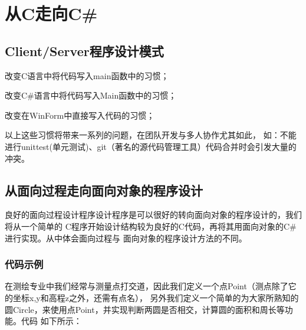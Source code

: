 ﻿%

\chapter{从C走向C\#}

\section{Client/Server程序设计模式}
改变C语言中将代码写入main函数中的习惯；

改变C\#语言中将代码写入Main函数中的习惯；

改变在WinForm中直接写入代码的习惯；

以上这些习惯将带来一系列的问题，在团队开发与多人协作尤其如此，
如：不能进行unittest(单元测试)、git（著名的源代码管理工具）代码合并时会引发大量的冲突。

\section{从面向过程走向面向对象的程序设计 }

良好的面向过程设计程序设计程序是可以很好的转向面向对象的程序设计的，我们将从一个简单的
C程序开始设计结构较为良好的C代码，再将其用面向对象的C\#进行实现。从中体会面向过程与
面向对象的程序设计方法的不同。
 
 \subsection{代码示例}
 
在测绘专业中我们经常与测量点打交道，因此我们定义一个点Point（测点除了它的坐标x,y和高程z之外，还需有点名），
 另外我们定义一个简单的为大家所熟知的圆Circle，来使用点Point，并实现判断两圆是否相交，计算圆的面积和周长等功能。代码
 如下所示：





% 
% 
% 

